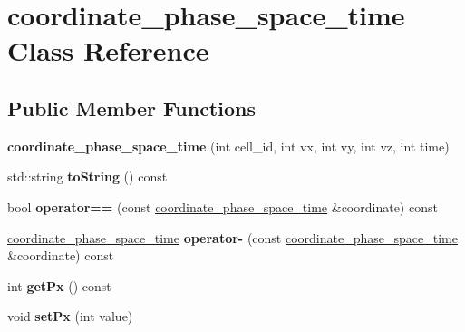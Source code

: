\hypertarget{classcoordinate__phase__space__time}{}\section{coordinate\+\_\+phase\+\_\+space\+\_\+time Class Reference}
\label{classcoordinate__phase__space__time}
\subsection*{Public Member Functions}
\begin{DoxyCompactItemize}
\item 
\mbox{\label{classcoordinate__phase__space__time_a5411014cb6971865077007b3083a1266}} 
{\bfseries coordinate\+\_\+phase\+\_\+space\+\_\+time} (int cell\+\_\+id, int vx, int vy, int vz, int time)
\item 
\mbox{\label{classcoordinate__phase__space__time_a452bc939706e9ab784e20acf7c5962e5}} 
std\+::string {\bfseries to\+String} () const
\item 
\mbox{\label{classcoordinate__phase__space__time_a2fc108d37f6ed6ca86193b9d8eab37af}} 
bool {\bfseries operator==} (const \hyperlink{classcoordinate__phase__space__time}{coordinate\+\_\+phase\+\_\+space\+\_\+time} \&coordinate) const
\item 
\mbox{\label{classcoordinate__phase__space__time_a4999341b3529dc6cc2e171aa561cc1fc}} 
\hyperlink{classcoordinate__phase__space__time}{coordinate\+\_\+phase\+\_\+space\+\_\+time} {\bfseries operator-\/} (const \hyperlink{classcoordinate__phase__space__time}{coordinate\+\_\+phase\+\_\+space\+\_\+time} \&coordinate) const
\item 
\mbox{\label{classcoordinate__phase__space__time_a2f2975643bb5ff55e87a0dc3be8f2076}} 
int {\bfseries get\+Px} () const
\item 
\mbox{\label{classcoordinate__phase__space__time_a600ab0d1e463f18a800c8df7a2b1aa3f}} 
void {\bfseries set\+Px} (int value)
\item 

\end{DoxyCompactItemize}
